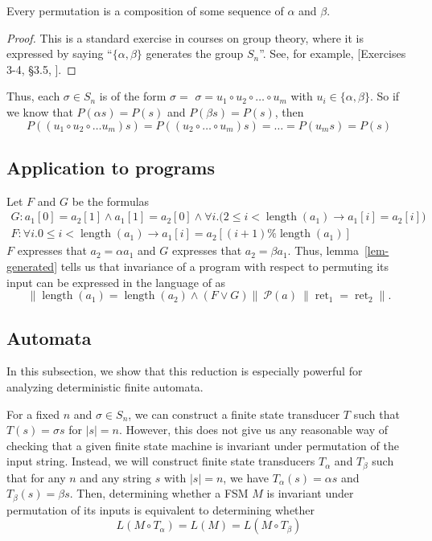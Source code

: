 \documentclass{llncs}
\DeclareMathOperator{\len}{length}
\DeclareMathOperator{\ret}{ret}
\begin{document}
  \begin{lemma} \label{lem-generated}
    Every permutation is a composition of some sequence of $\alpha$ and $\beta$.
  \end{lemma}
  \begin{proof}
    This is a standard exercise in courses on group theory,
    where it is expressed by saying ``$\{\alpha,\beta\}$ generates 
    the group $S_n$''.
    See, for example, [Exercises 3-4, \S3.5, \cite{dummitfoote}].
  \end{proof}

  Thus, each $\sigma \in S_n$ is of the form $\sigma = $
  $\sigma = u_1 \circ u_2 \circ \ldots \circ u_m$ with
  $u_i \in \{\alpha,\beta\}$.
  So if we know that $P(\alpha s) = P(s)$ and $P(\beta s) = P(s)$,
  then 
  \[ P((u_1\circ u_2\circ \ldots u_m)s)
    = P((u_2 \circ \ldots \circ u_m)s)
    = \ldots = P(u_ms) = P(s)
  \]


  \subsection{Application to programs}

    Let \(F\) and \(G\) be the formulas
    \begin{gather*}
        G: a_{1}[0] = a_{2}[1] \wedge a_{1}[1] = a_{2}[0] \wedge 
          \forall i.\big( 2 \leq i < \len(a_{1}) \rightarrow a_{1}[i] = a_{2}[i] \big) \\
        F:  \forall i. 0 \leq i < \len(a_{1}) \rightarrow a_{1}[i] = a_{2}[(i+1)\%\len(a_{1})]
    \end{gather*}
    $F$ expresses that $a_2 = \alpha a_1$ and $G$ expresses that 
    $a_2 = \beta a_1$.
    Thus, lemma~\ref{lem-generated} tells us that
    invariance of a program with respect to permuting its input
    can be expressed in the language of \cite{sousa16} as
    \[
      \|\len(a_{1}) = \len(a_{2}) \wedge (F \vee G)\| \ 
        \mathcal{P}(a) \  \|\ret_{1} = \ret_{2}\|.
    \]

  \subsection{Automata}
    In this subsection, we show that this reduction is especially powerful for
    analyzing deterministic finite automata.

    For a fixed $n$ and $\sigma \in S_n$, we can construct a finite state
    transducer $T$ such that $T(s) = \sigma s$ for $|s|=n$.  However, this does
    not give us any reasonable way of checking that a given finite state machine
    is invariant under permutation of the input string.  Instead, we will
    construct finite state transducers $T_{\alpha}$ and $T_{\beta}$ such that
    for any $n$ and any string $s$ with $|s|=n$, we have $T_{\alpha}(s)=\alpha s$
    and $T_{\beta}(s) =\beta s$. Then, determining whether a FSM $M$ is
    invariant under permutation of its inputs is equivalent to determining
    whether
    \[
      L(M \circ T_\alpha) = L(M) = L(M \circ T_\beta)
    \]
\end{document}
